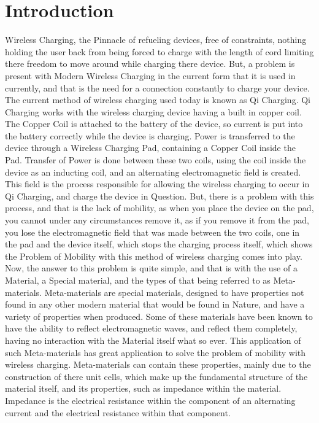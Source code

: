 \documentclass[]{article}
\begin{document}
\section{Introduction}
Wireless Charging, the Pinnacle of refueling devices, free of constraints, nothing holding the user back from being forced to charge with the length of cord limiting there freedom to move around while charging there device. But, a problem is present with Modern Wireless Charging in the current form that it is used in currently, and that is the need for a connection constantly to charge your device. The current method of wireless charging used today is known as Qi Charging. Qi Charging works with the wireless charging device having a built in copper coil. The Copper Coil is attached to the battery of the device, so current is put into the battery correctly while the device is charging. Power is transferred to the device through a Wireless Charging Pad, containing a Copper Coil inside the Pad. Transfer of Power is done between these two coils, using the coil inside the device as an inducting coil, and an alternating electromagnetic field is created. This field is the process responsible for allowing the wireless charging to occur in Qi Charging, and charge the device in Question. But, there is a problem with this process, and that is the lack of mobility, as when you place the device on the pad, you cannot under any circumstances remove it, as if you remove it from the pad, you lose the electromagnetic field that was made between the two coils, one in the pad and the device itself, which stops the charging process itself, which shows the Problem of Mobility with this method of wireless charging comes into play. Now, the answer to this problem is quite simple, and that is with the use of a Material, a Special material, and the types of that being referred to as Meta-materials. Meta-materials are special materials, designed to have properties not found in any other modern material that would be found in Nature, and have a variety of properties when produced. Some of these materials have been known to have the ability to reflect electromagnetic waves, and reflect them completely, having no interaction with the Material itself what so ever. This application of such Meta-materials has great application to solve the problem of mobility with wireless charging. Meta-materials can contain these properties, mainly due to the construction of there unit cells, which make up the fundamental structure of the material itself, and its properties, such as impedance within the material. Impedance is the electrical resistance within the component of an alternating current and the electrical resistance within that component.
\end{document}
